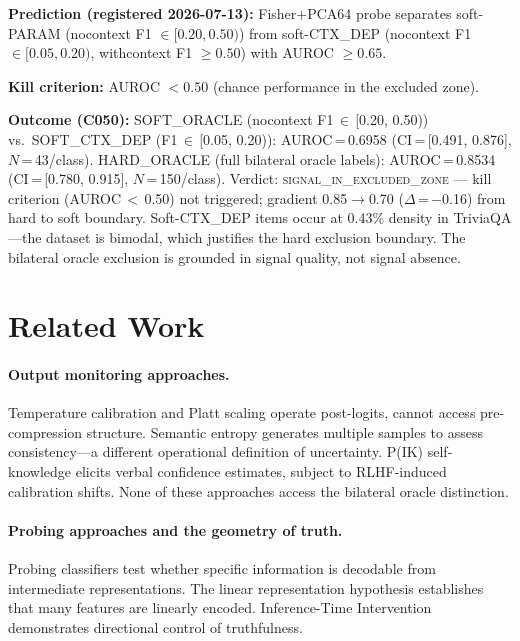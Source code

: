 \documentclass[11pt]{article}
\begin{document}
\textbf{Prediction (registered 2026-07-13):}
Fisher+PCA64 probe separates soft-PARAM (nocontext F1 $\in [0.20, 0.50)$)
from soft-CTX\_DEP (nocontext F1 $\in [0.05, 0.20)$, withcontext F1 $\geq 0.50$)
with AUROC $\geq 0.65$.

\textbf{Kill criterion:} AUROC $< 0.50$ (chance performance in the excluded zone).

\textbf{Outcome (C050):} SOFT\_ORACLE (nocontext F1\,$\in$\,[0.20, 0.50)) vs.\
SOFT\_CTX\_DEP (F1\,$\in$\,[0.05, 0.20)): AUROC\,=\,0.6958 (CI\,=\,[0.491, 0.876],
$N$\,=\,43/class). HARD\_ORACLE (full bilateral oracle labels): AUROC\,=\,0.8534
(CI\,=\,[0.780, 0.915], $N$\,=\,150/class).
Verdict: \textsc{signal\_in\_excluded\_zone} --- kill criterion (AUROC\,$<$\,0.50) not
triggered; gradient 0.85$\to$0.70 ($\Delta$\,=\,$-$0.16) from hard to soft boundary.
Soft-CTX\_DEP items occur at 0.43\% density in TriviaQA---the dataset is bimodal, which
justifies the hard exclusion boundary. The bilateral oracle exclusion is grounded in
signal quality, not signal absence.

\section{Related Work}
\label{sec:related}

\paragraph{Output monitoring approaches.}
Temperature calibration \citep{guo2017calibration} and Platt scaling operate
post-logits, cannot access pre-compression structure. Semantic entropy
\citep{kuhn2023semantic} generates multiple samples to assess consistency---a different
operational definition of uncertainty. P(IK) self-knowledge \citep{kadavath2022know}
elicits verbal confidence estimates, subject to RLHF-induced calibration shifts. None
of these approaches access the bilateral oracle distinction.

\paragraph{Probing approaches and the geometry of truth.}
Probing classifiers \citep{alain2016probing,tenney2019bert} test whether specific
information is decodable from intermediate representations. The linear representation
hypothesis \citep{elhage2022solu} establishes that many features are linearly encoded.
Inference-Time Intervention \citep{li2023iti} demonstrates directional control of
truthfulness.
\end{document}
